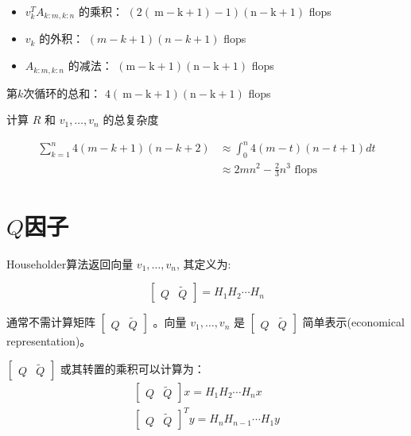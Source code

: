 \begin{itemize}
    \item $ v_{k}^{T} A_{k: m, k: n} $ 的乘积： $ (2(\mathrm{~m}-\mathrm{k}+1)-1)(\mathrm{n}-\mathrm{k}+1) $ flops
    \item $ v_{k} $ 的外积： $ (m-k+1)(n-k+1) $ flops
    \item $ A_{k: m, k: n} $ 的减法： $ (\mathrm{m}-\mathrm{k}+1)(\mathrm{n}-\mathrm{k}+1) $ flops
\end{itemize}

第$k$次循环的总和： $ 4(\mathrm{~m}-\mathrm{k}+1)(\mathrm{n}-\mathrm{k}+1) $ flops

计算 $ R $ 和 $ v_{1}, \ldots, v_{n} $ 的总复杂度

$$ \begin{aligned} \sum_{k=1}^{n} 4(m-k+1)(n-k+2) & \approx \int_{0}^{n} 4(m-t)(n-t+1) d t \\ & \approx 2 m n^{2}-\frac{2}{3} n^{3} \text { flops } \end{aligned} $$

\section{$Q$因子}

Householder算法返回向量 $ v_{1}, \ldots, v_{n} $, 其定义为:

\begin{definition}
   $$
\left[\begin{array}{ll}
Q & \tilde{Q}
\end{array}\right]=H_{1} H_{2} \cdots H_{n}
$$ 
\end{definition}

通常不需计算矩阵 $ \left[\begin{array}{ll}Q & \tilde{Q}\end{array}\right] $ 。向量 $ v_{1}, \ldots, v_{n} $ 是 $ \left[\begin{array}{ll}Q & \tilde{Q}\end{array}\right] $ 简单表示(economical representation)。

\begin{theorem}
    $ \left[\begin{array}{ll}Q & \tilde{Q}\end{array}\right] $ 或其转置的乘积可以计算为：
$$
\begin{array}{c}
{\left[\begin{array}{cc}
Q & \tilde{Q}
\end{array}\right] x=H_{1} H_{2} \cdots H_{n} x} \\
{\left[\begin{array}{ll}
Q & \tilde{Q}
\end{array}\right]^{T} y=H_{n} H_{n-1} \cdots H_{1} y}
\end{array}
$$
\end{theorem}

